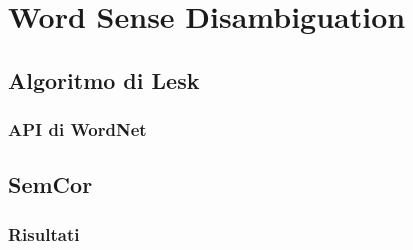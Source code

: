 \chapter{Word Sense Disambiguation}

\section{Algoritmo di Lesk}

\subsection{API di WordNet}

\section{SemCor}

\subsection{Risultati}



